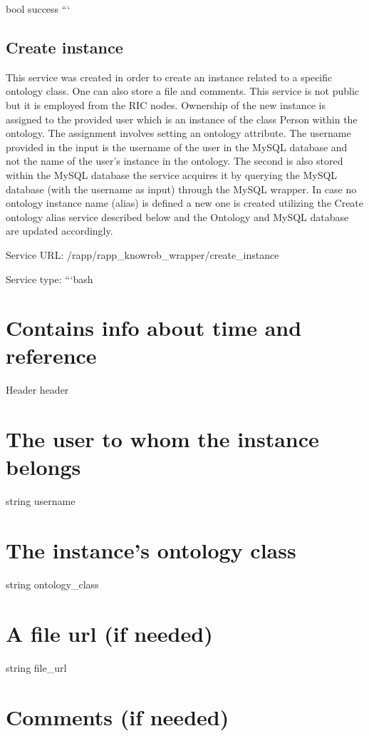 bool success ```

\subsection*{Create instance}

This service was created in order to create an instance related to a specific ontology class. One can also store a file and comments. This service is not public but it is employed from the R\-I\-C nodes. Ownership of the new instance is assigned to the provided user which is an instance of the class Person within the ontology. The assignment involves setting an ontology attribute. The username provided in the input is the username of the user in the My\-S\-Q\-L database and not the name of the user’s instance in the ontology. The second is also stored within the My\-S\-Q\-L database the service acquires it by querying the My\-S\-Q\-L database (with the username as input) through the My\-S\-Q\-L wrapper. In case no ontology instance name (alias) is defined a new one is created utilizing the Create ontology alias service described below and the Ontology and My\-S\-Q\-L database are updated accordingly.

Service U\-R\-L\-: {\ttfamily /rapp/rapp\-\_\-knowrob\-\_\-wrapper/create\-\_\-instance}

Service type\-: ```bash \section*{Contains info about time and reference}

Header header \section*{The user to whom the instance belongs}

string username \section*{The instance’s ontology class}

string ontology\-\_\-class \section*{A file url (if needed)}

string file\-\_\-url \section*{Comments (if needed)}

